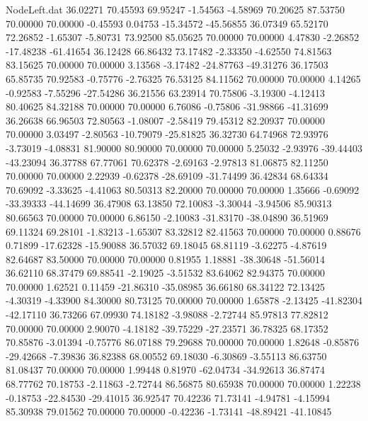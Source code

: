 \begin{filecontents}{NodeLeft.dat}
  36.02271   70.45593   69.95247    -1.54563   -4.58969   70.20625   87.53750   70.00000   70.00000   -0.45593    0.04753  -15.34572  -45.56855
  36.07349   65.52170   72.26852    -1.65307   -5.80731   73.92500   85.05625   70.00000   70.00000    4.47830   -2.26852  -17.48238  -61.41654
  36.12428   66.86432   73.17482    -2.33350   -4.62550   74.81563   83.15625   70.00000   70.00000    3.13568   -3.17482  -24.87763  -49.31276
  36.17503   65.85735   70.92583    -0.75776   -2.76325   76.53125   84.11562   70.00000   70.00000    4.14265   -0.92583   -7.55296  -27.54286
  36.21556   63.23914   70.75806    -3.19300   -4.12413   80.40625   84.32188   70.00000   70.00000    6.76086   -0.75806  -31.98866  -41.31699
  36.26638   66.96503   72.80563    -1.08007   -2.58419   79.45312   82.20937   70.00000   70.00000    3.03497   -2.80563  -10.79079  -25.81825
  36.32730   64.74968   72.93976    -3.73019   -4.08831   81.90000   80.90000   70.00000   70.00000    5.25032   -2.93976  -39.44403  -43.23094
  36.37788   67.77061   70.62378    -2.69163   -2.97813   81.06875   82.11250   70.00000   70.00000    2.22939   -0.62378  -28.69109  -31.74499
  36.42834   68.64334   70.69092    -3.33625   -4.41063   80.50313   82.20000   70.00000   70.00000    1.35666   -0.69092  -33.39333  -44.14699
  36.47908   63.13850   72.10083    -3.30044   -3.94506   85.90313   80.66563   70.00000   70.00000    6.86150   -2.10083  -31.83170  -38.04890
  36.51969   69.11324   69.28101    -1.83213   -1.65307   83.32812   82.41563   70.00000   70.00000    0.88676    0.71899  -17.62328  -15.90088
  36.57032   69.18045   68.81119    -3.62275   -4.87619   82.64687   83.50000   70.00000   70.00000    0.81955    1.18881  -38.30648  -51.56014
  36.62110   68.37479   69.88541    -2.19025   -3.51532   83.64062   82.94375   70.00000   70.00000    1.62521    0.11459  -21.86310  -35.08985
  36.66180   68.34122   72.13425    -4.30319   -4.33900   84.30000   80.73125   70.00000   70.00000    1.65878   -2.13425  -41.82304  -42.17110
  36.73266   67.09930   74.18182    -3.98088   -2.72744   85.97813   77.82812   70.00000   70.00000    2.90070   -4.18182  -39.75229  -27.23571
  36.78325   68.17352   70.85876    -3.01394   -0.75776   86.07188   79.29688   70.00000   70.00000    1.82648   -0.85876  -29.42668   -7.39836
  36.82388   68.00552   69.18030    -6.30869   -3.55113   86.63750   81.08437   70.00000   70.00000    1.99448    0.81970  -62.04734  -34.92613
  36.87474   68.77762   70.18753    -2.11863   -2.72744   86.56875   80.65938   70.00000   70.00000    1.22238   -0.18753  -22.84530  -29.41015
  36.92547   70.42236   71.73141    -4.94781   -4.15994   85.30938   79.01562   70.00000   70.00000   -0.42236   -1.73141  -48.89421  -41.10845

\end{filecontents}
